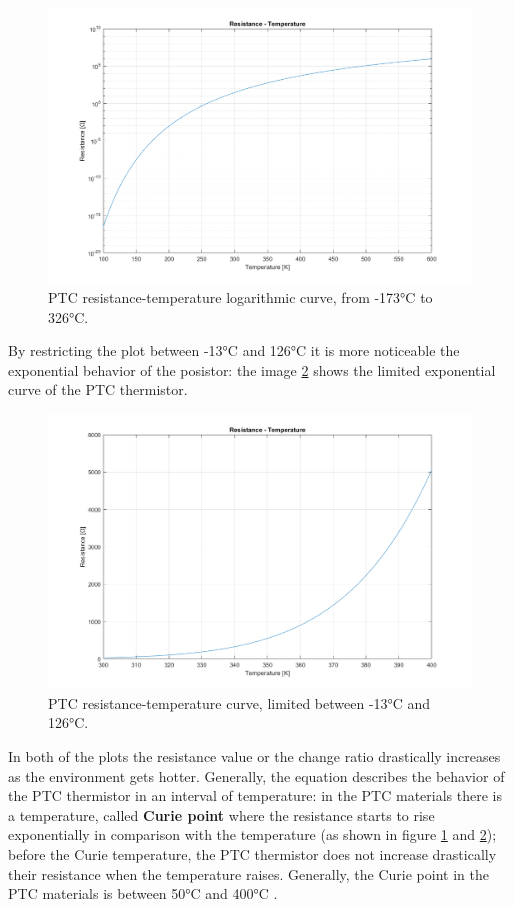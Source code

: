 \begin{figure}[h]
    \centering
    \includegraphics[width = .75\textwidth]{../res/plots/PTC_logarithmic.png}
    \caption{PTC resistance-temperature logarithmic curve, from -173°C to 326°C.}
    \label{fig:PTC_logarithmic}
\end{figure}

\FloatBarrier\noindent By restricting the plot between -13°C and 126°C it is more noticeable the exponential behavior of the posistor: the image \ref{fig:PTC_cartesian} shows the limited exponential curve of the PTC thermistor.

\begin{figure}[h]
    \centering
    \includegraphics[width = .75\textwidth]{../res/plots/PTC_cartesian.png}
    \caption{PTC resistance-temperature curve, limited between -13°C and 126°C.}
    \label{fig:PTC_cartesian}
\end{figure}

\FloatBarrier\noindent In both of the plots the resistance value or the change ratio drastically increases as the environment gets hotter. Generally, the equation describes the behavior of the PTC thermistor in an interval of temperature: in the PTC materials there is a temperature, called \textbf{Curie point} where the resistance starts to rise exponentially in comparison with the temperature (as shown in figure \ref{fig:PTC_logarithmic} and \ref{fig:PTC_cartesian}); before the Curie temperature, the PTC thermistor does not increase drastically their resistance when the temperature raises. Generally, the Curie point in the PTC materials is between 50°C and 400°C \cite{Cheng2014441}.

